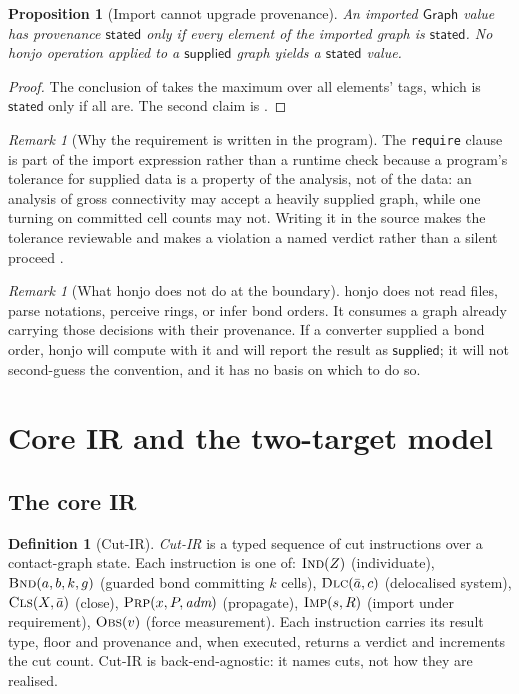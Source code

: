 \documentclass[11pt,twocolumn,a4paper]{article}
\theoremstyle{thmstyle}
\newtheorem{proposition}[theorem]{Proposition}
\theoremstyle{definition}
\newtheorem{definition}[theorem]{Definition}
\theoremstyle{remark}
\newtheorem{remark}[theorem]{Remark}
\newcommand{\hj}[1]{\texttt{#1}}
\newcommand{\stated}{\textsf{stated}}
\newcommand{\supplied}{\textsf{supplied}}
\begin{document}
\begin{proposition}[Import cannot upgrade provenance]
\label{prop:import-no-upgrade}
An imported $\mathsf{Graph}$ value has provenance $\stated$ only if every
element of the imported graph is $\stated$. No honjo operation applied to
a $\supplied$ graph yields a $\stated$ value.
\end{proposition}

\begin{proof}
The conclusion of  takes the maximum over all elements'
tags, which is $\stated$ only if all are. The second claim is
.
\end{proof}

\begin{remark}[Why the requirement is written in the program]
\label{rem:req-in-program}
The \hj{require} clause is part of the import expression rather than a
runtime check because a program's tolerance for supplied data is a
property of the analysis, not of the data: an analysis of gross
connectivity may accept a heavily supplied graph, while one turning on
committed cell counts may not. Writing it in the source makes the
tolerance reviewable and makes a violation a named verdict rather than a
silent proceed \citep{fourches2010}.
\end{remark}

\begin{remark}[What honjo does not do at the boundary]
\label{rem:boundary-scope}
honjo does not read files, parse notations, perceive rings, or infer bond
orders. It consumes a graph already carrying those decisions with their
provenance. If a converter supplied a bond order, honjo will compute with
it and will report the result as $\supplied$; it will not second-guess
the convention, and it has no basis on which to do so.
\end{remark}

\section{Core IR and the two-target model}
\label{sec:ir}

\subsection{The core IR}

\begin{definition}[Cut-IR]
\label{def:ir}
\emph{Cut-IR} is a typed sequence of cut instructions over a contact-graph
state. Each instruction is one of: $\textsc{Ind}(Z)$ (individuate),
$\textsc{Bnd}(a,b,k,g)$ (guarded bond committing $k$ cells),
$\textsc{Dlc}(\bar a,c)$ (delocalised system), $\textsc{Cls}(X,\bar a)$
(close), $\textsc{Prp}(x,P,\textit{adm})$ (propagate),
$\textsc{Imp}(s,R)$ (import under requirement), $\textsc{Obs}(v)$ (force
measurement). Each instruction carries its result type, floor and
provenance and, when executed, returns a verdict and increments the cut
count. Cut-IR is back-end-agnostic: it names cuts, not how they are
realised.
\end{definition}
\end{document}
